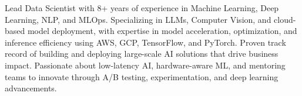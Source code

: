 

\begin{cvparagraph}

Lead Data Scientist with 8+ years of 
experience in Machine Learning, Deep Learning, NLP, and MLOps. 
Specializing in LLMs, Computer Vision, and cloud-based model 
deployment, with expertise in model acceleration, optimization, 
and inference efficiency using AWS, GCP, TensorFlow, and PyTorch. 
Proven track record of building and deploying large-scale AI solutions 
that drive business impact. Passionate about low-latency AI, 
hardware-aware ML, and mentoring teams to innovate through A/B testing, 
experimentation, and deep learning advancements.
\end{cvparagraph}

